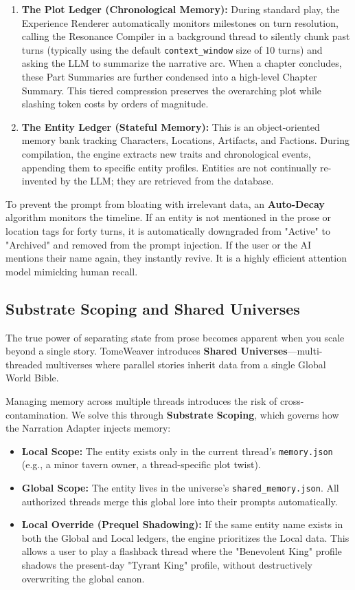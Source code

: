 \documentclass[12pt, a4paper]{article}
\begin{document}
\begin{enumerate}
    \item \textbf{The Plot Ledger (Chronological Memory):} During standard play, the Experience Renderer automatically monitors milestones on turn resolution, calling the Resonance Compiler in a background thread to silently chunk past turns (typically using the default \texttt{context\_window} size of 10 turns) and asking the LLM to summarize the narrative arc. When a chapter concludes, these Part Summaries are further condensed into a high-level Chapter Summary. This tiered compression preserves the overarching plot while slashing token costs by orders of magnitude.
    \item \textbf{The Entity Ledger (Stateful Memory):} This is an object-oriented memory bank tracking Characters, Locations, Artifacts, and Factions. During compilation, the engine extracts new traits and chronological events, appending them to specific entity profiles. Entities are not continually re-invented by the LLM; they are retrieved from the database.
\end{enumerate}

To prevent the prompt from bloating with irrelevant data, an \textbf{Auto-Decay} algorithm monitors the timeline. If an entity is not mentioned in the prose or location tags for forty turns, it is automatically downgraded from "Active" to "Archived" and removed from the prompt injection. If the user or the AI mentions their name again, they instantly revive. It is a highly efficient attention model mimicking human recall.

\subsection{Substrate Scoping and Shared Universes}

The true power of separating state from prose becomes apparent when you scale beyond a single story. TomeWeaver introduces \textbf{Shared Universes}---multi-threaded multiverses where parallel stories inherit data from a single Global World Bible.

Managing memory across multiple threads introduces the risk of cross-contamination. We solve this through \textbf{Substrate Scoping}, which governs how the Narration Adapter injects memory:

\begin{itemize}
    \item \textbf{Local Scope:} The entity exists only in the current thread's \texttt{memory.json} (e.g., a minor tavern owner, a thread-specific plot twist).
    \item \textbf{Global Scope:} The entity lives in the universe's \texttt{shared\_memory.json}. All authorized threads merge this global lore into their prompts automatically.
    \item \textbf{Local Override (Prequel Shadowing):} If the same entity name exists in both the Global and Local ledgers, the engine prioritizes the Local data. This allows a user to play a flashback thread where the "Benevolent King" profile shadows the present-day "Tyrant King" profile, without destructively overwriting the global canon. 
\end{itemize}
\end{document}

